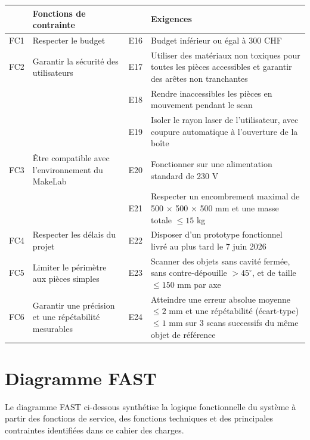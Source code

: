 \documentclass[11pt,a4paper]{report}
\begin{document}
\begin{center}
\begin{tabularx}{\textwidth}{c X c X}
\toprule
 & \textbf{Fonctions de contrainte} &  & \textbf{Exigences} \\
\midrule
FC1 & Respecter le budget & E16 & Budget inférieur ou égal à 300 CHF \\
\midrule
FC2 & Garantir la sécurité des utilisateurs & E17 & Utiliser des matériaux non toxiques pour toutes les pièces accessibles et garantir des arêtes non tranchantes \\
 &  & E18 & Rendre inaccessibles les pièces en mouvement pendant le scan \\
 &  & E19 & Isoler le rayon laser de l'utilisateur, avec coupure automatique à l’ouverture de la boîte \\
\midrule
FC3 & Être compatible avec l'environnement du MakeLab & E20 & Fonctionner sur une alimentation standard de 230 V \\
 &  & E21 & Respecter un encombrement maximal de 500 $\times$ 500 $\times$ 500 mm et une masse totale $\leq 15$ kg \\
\midrule
FC4 & Respecter les délais du projet & E22 & Disposer d’un prototype fonctionnel livré au plus tard le 7 juin 2026 \\
\midrule
FC5 & Limiter le périmètre aux pièces simples & E23 & Scanner des objets sans cavité fermée, sans contre-dépouille $>45^\circ$, et de taille $\leq 150$ mm par axe \\
\midrule
FC6 & Garantir une précision et une répétabilité mesurables & E24 & Atteindre une erreur absolue moyenne $\leq 2$ mm et une répétabilité (écart-type) $\leq 1$ mm sur 3 scans successifs du même objet de référence \\
\bottomrule
\end{tabularx}
\end{center}


\chapter{Diagramme FAST}

Le diagramme FAST ci-dessous synthétise la logique fonctionnelle du système à partir des fonctions de service, des fonctions techniques et des principales contraintes identifiées dans ce cahier des charges.
\end{document}
